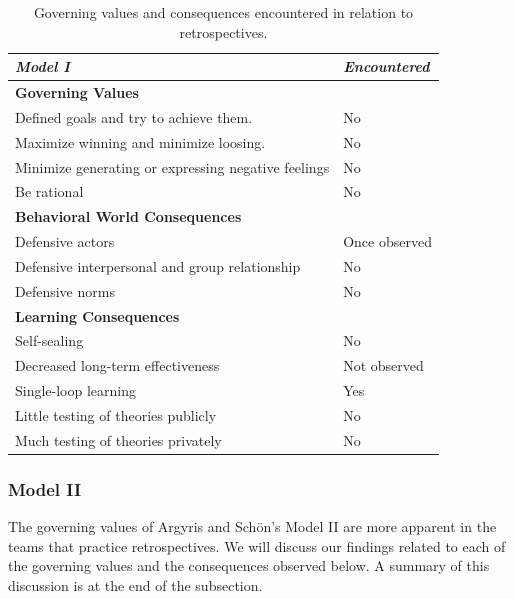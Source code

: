 \begin{table}[h]
	\begin{center}
		\caption{Governing values and consequences encountered in relation to retrospectives.}
		\label{table:model-i-occurences}
		\begin{tabular}{l l}
			\hline
			\textit{Model I} & \textit{Encountered} \\
			\hline
			\textbf{Governing Values} & \\
			Defined goals and try to achieve them. & No \\
			Maximize winning and minimize loosing. & No \\
			Minimize generating or expressing negative feelings & No \\
			Be rational & No \\
			\hline
			\textbf{Behavioral World Consequences} & \\
			Defensive actors & Once observed \\
			Defensive interpersonal and group relationship & No \\
			Defensive norms & No \\
			\hline
			\textbf{Learning Consequences} & \\
			Self-sealing & No \\
			Decreased long-term effectiveness & Not observed \\
			Single-loop learning & Yes \\
			Little testing of theories publicly & No \\
			Much testing of theories privately & No \\
			\hline
		\end{tabular}
	\end{center}
\end{table}

\subsubsection{Model II}
The governing values of Argyris and Schön's Model II are more apparent in the teams that practice retrospectives. We will discuss our findings related to each of the governing values and the consequences observed below. A summary of this discussion is at the end of the subsection. 

